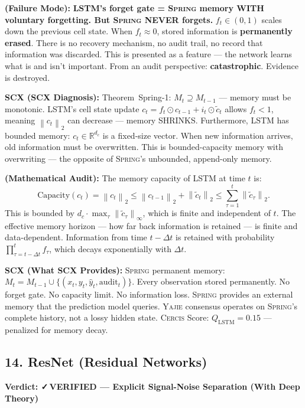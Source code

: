 \documentclass[12pt,a4paper]{article}
\theoremstyle{definition}
\newcommand{\verified}{{\color{verifiedcolor}\textbf{✓\,VERIFIED}}}
\newcommand{\Yajie}{\textsc{Yajie}}
\newcommand{\Spring}{\textsc{Spring}}
\newcommand{\Cercis}{\textsc{Cercis}}
\newcommand{\R}{\mathbb{R}}
\newcommand{\norm}[1]{\left\lVert#1\right\rVert}
\newcommand{\auditHeader}[1]{\medskip\noindent\textbf{\large #1}\medskip}
\newcommand{\whyFail}{\noindent\textbf{ (Failure Mode):} }
\newcommand{\whatMissing}{\noindent\textbf{SCX (What SCX Provides):} }
\newcommand{\diagnosis}{\noindent\textbf{SCX (SCX Diagnosis):} }
\newcommand{\mathAudit}{\noindent\textbf{ (Mathematical Audit):} }
\begin{document}
\whyFail{} \textbf{LSTM's forget gate = \Spring{} memory WITH voluntary forgetting. But \Spring{} NEVER forgets.} $f_t \in (0,1)$ scales down the previous cell state. When $f_t \approx 0$, stored information is \textbf{permanently erased}. There is no recovery mechanism, no audit trail, no record that information was discarded. This is presented as a feature — the network learns what is and isn't important. From an audit perspective: \textbf{catastrophic}. Evidence is destroyed.

\diagnosis{} Theorem~Spring-1: $M_t \supseteq M_{t-1}$ — memory must be monotonic. LSTM's cell state update $c_t = f_t \odot c_{t-1} + i_t \odot \tilde{c}_t$ allows $f_t < 1$, meaning $\norm{c_t}_2$ can decrease — memory SHRINKS. Furthermore, LSTM has bounded memory: $c_t \in \R^{d_c}$ is a fixed-size vector. When new information arrives, old information must be overwritten. This is bounded-capacity memory with overwriting — the opposite of \Spring{}'s unbounded, append-only memory.

\mathAudit{} The memory capacity of LSTM at time $t$ is:
\[
\text{Capacity}(c_t) = \norm{c_t}_2 \le \norm{c_{t-1}}_2 + \norm{\tilde{c}_t}_2 \le \sum_{\tau=1}^t \norm{\tilde{c}_\tau}_2.
\]
This is bounded by $d_c \cdot \max_\tau \norm{\tilde{c}_\tau}_\infty$, which is finite and independent of $t$. The effective memory horizon — how far back information is retained — is finite and data-dependent. Information from time $t - \Delta t$ is retained with probability $\prod_{\tau=t-\Delta t}^t f_\tau$, which decays exponentially with $\Delta t$.

\whatMissing{} \Spring{} permanent memory: $M_t = M_{t-1} \cup \{(x_t, y_t, \hat{y}_t, \text{audit}_t)\}$. Every observation stored permanently. No forget gate. No capacity limit. No information loss. \Spring{} provides an external memory that the prediction model queries. \Yajie{} consensus operates on \Spring{}'s complete history, not a lossy hidden state. \Cercis{} Score: $Q_{\text{LSTM}} = 0.15$ — penalized for memory decay.

\subsection{14. ResNet (Residual Networks) }

\auditHeader{Verdict: \verified{} — Explicit Signal-Noise Separation (With Deep Theory)}
\end{document}
